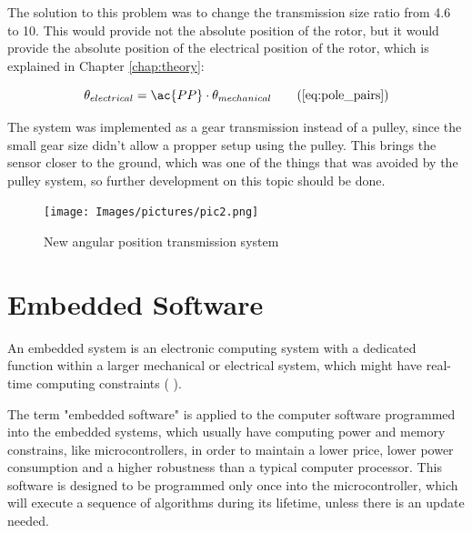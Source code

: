 The solution to this problem was to change the transmission size ratio from 4.6 to 10. This would provide not the absolute position of the rotor, but it would provide the absolute position of the electrical position of the rotor, which is explained in Chapter \ref{chap:theory}:

\begin{equation}
	\theta_{electrical} = \ac{PP} \cdot \theta_{mechanical} \tag{\ref{eq:pole_pairs}}
\end{equation}

The system was implemented as a gear transmission instead of a pulley, since the small gear size didn't allow a propper setup using the pulley. This brings the sensor closer to the ground, which was one of the things that was avoided by the pulley system, so further development on this topic should be done.

\vfill
\begin{figure}[htbp]
\centering
\texttt{[image: Images/pictures/pic2.png]} 
\caption[New angular position transmission system]{New angular position transmission system}
\label{fig:pic2}
\end{figure}
\vfill


\clearpage
\section{Embedded Software}\label{sec:software}

An embedded system is an electronic computing system with a dedicated function within a larger mechanical or electrical system, which might have real-time computing constraints (\citeauthor{embeddedSystemsDesign} \citeyear{embeddedSystemsDesign}).

The term "embedded software" is applied to the computer software programmed into the embedded systems, which usually have computing power and memory constrains, like microcontrollers, in order to maintain a lower price, lower power consumption and a higher robustness than a typical computer processor. This software is designed to be programmed only once into the microcontroller, which will execute a sequence of algorithms during its lifetime, unless there is an update needed.


